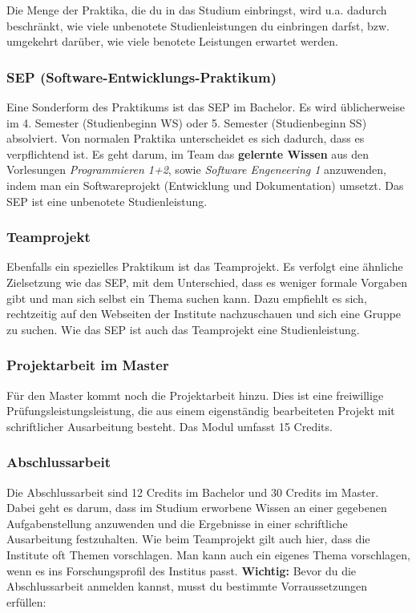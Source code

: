 \noindent	Die Menge der Praktika, die du in das Studium einbringst, wird u.a. dadurch beschränkt, wie viele unbenotete Studienleistungen du einbringen darfst, bzw. umgekehrt darüber, wie viele benotete Leistungen erwartet werden.



	\subsubsection*{SEP (Software-Entwicklungs-Praktikum)}
	Eine Sonderform des Praktikums ist das SEP im Bachelor. Es wird üblicherweise im 4. Semester (Studienbeginn WS) oder 5. Semester (Studienbeginn SS) absolviert. Von normalen Praktika unterscheidet es sich dadurch, dass es verpflichtend ist. Es geht darum, im Team das \textbf{gelernte Wissen} aus den Vorlesungen \emph{Programmieren 1+2}, sowie \emph{Software Engeneering 1} anzuwenden, indem man ein Softwareprojekt (Entwicklung und Dokumentation) umsetzt. Das SEP ist eine unbenotete Studienleistung.

	\subsubsection*{Teamprojekt}
	Ebenfalls ein spezielles Praktikum ist das Teamprojekt. Es verfolgt eine ähnliche Zielsetzung wie das SEP, mit dem Unterschied, dass es weniger formale Vorgaben gibt und man sich selbst ein Thema suchen kann. Dazu empfiehlt es sich, rechtzeitig auf den Webseiten der Institute nachzuschauen und sich eine Gruppe zu suchen. Wie das SEP ist auch das Teamprojekt eine Studienleistung.

	\subsubsection{Projektarbeit im Master}
	Für den Master kommt noch die Projektarbeit hinzu. Dies ist eine
	freiwillige Prüfungsleistungsleistung, die aus einem eigenständig
	bearbeiteten Projekt mit schriftlicher Ausarbeitung besteht. Das Modul umfasst 15 Credits.

	\subsubsection{Abschlussarbeit}
	Die Abschlussarbeit sind 12 Credits im Bachelor und 30 Credits im Master. Dabei geht es darum, dass im Studium erworbene Wissen an einer gegebenen Aufgabenstellung anzuwenden und  die Ergebnisse in einer schriftliche Ausarbeitung festzuhalten. Wie beim Teamprojekt gilt auch hier, dass die Institute oft Themen vorschlagen.  Man kann auch ein eigenes Thema vorschlagen, wenn es ins Forschungsprofil des Institus passt. \textbf{Wichtig:} Bevor du die Abschlussarbeit anmelden kannst, musst du bestimmte Vorraussetzungen erfüllen:

